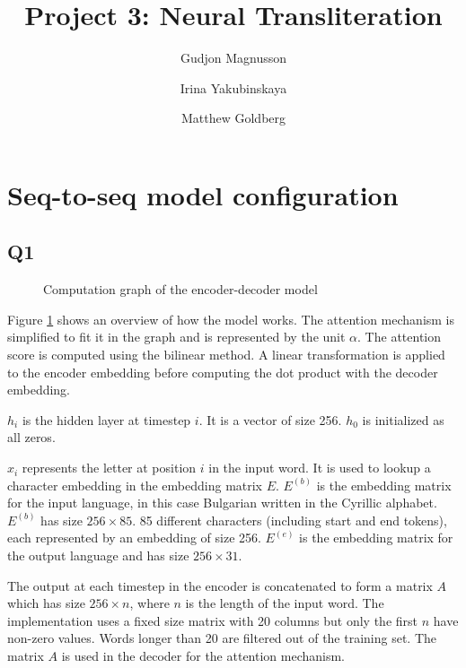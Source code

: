 \documentclass[12pt]{article}
\begin{document}
\title{
	Project 3: Neural Transliteration
}
\author{
Gudjon Magnusson 
\and Irina Yakubinskaya 
\and Matthew Goldberg
}

\maketitle


\section{Seq-to-seq model configuration}

\subsection{Q1}

\begin{figure}[!h]
\centering



\caption{Computation graph of the encoder-decoder model}
\label{fig_compgraph}
\end{figure}

Figure \ref{fig_compgraph} shows an overview of how the model works. The attention mechanism is simplified to fit it in the graph and is represented by the unit $\alpha$. The attention score is computed using the bilinear method. A linear transformation is applied to the encoder embedding before computing the dot product with the decoder embedding.

$h_i$ is the hidden layer at timestep $i$. It is a vector of size 256. $h_0$ is initialized as all zeros.

$x_i$ represents the letter at position $i$ in the input word. It is used to lookup a character embedding in the embedding matrix $E$. $E^{(b)}$ is the embedding matrix for the input language, in this case Bulgarian written in the Cyrillic alphabet. $E^{(b)}$ has size $256 \times 85$. 85 different characters (including start and end tokens), each represented by an embedding of size 256. $E^{(e)}$ is the embedding matrix for the output language and has size $256 \times 31$.

The output at each timestep in the encoder is concatenated to form a matrix $A$ which has size $256 \times n$, where $n$ is the length of the input word. The implementation uses a fixed size matrix with 20 columns but only the first $n$ have non-zero values. Words longer than 20 are filtered out of the training set.
The matrix $A$ is used in the decoder for the attention mechanism.
\end{document}
